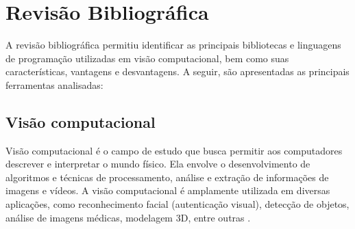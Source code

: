 
\section{Revisão Bibliográfica}

A revisão bibliográfica permitiu identificar as principais bibliotecas e linguagens de programação utilizadas em visão computacional, bem como suas características, vantagens e desvantagens. A seguir, são apresentadas as principais ferramentas analisadas:

\subsection{Visão computacional}
Visão computacional é o campo de estudo que busca permitir aos computadores descrever e interpretar o mundo físico. Ela envolve o desenvolvimento de algoritmos e técnicas de processamento, análise e extração de informações de imagens e vídeos. A visão computacional é amplamente utilizada em diversas aplicações, como reconhecimento facial (autenticação visual), detecção de objetos, análise de imagens médicas, modelagem 3D, entre outras \cite{Szeliski2022}.

